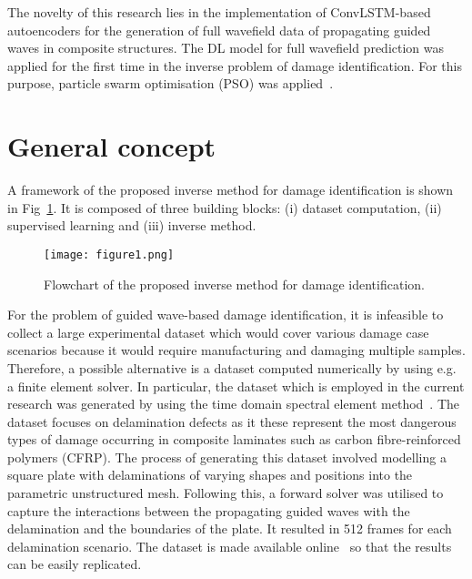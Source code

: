\documentclass[pdflatex,sn-mathphys-num]{sn-jnl}%
\begin{document}
	The novelty of this research lies in the implementation of ConvLSTM-based 
	autoencoders for the generation of full wavefield data of propagating 
	guided waves in composite structures.
	The DL model for full wavefield prediction was applied for the first time 
	in the inverse problem of damage identification.
	For this purpose, particle swarm optimisation (PSO) was 
	applied~\cite{Keneddy1995}.
	\section{General concept}\label{sec2}
	A framework of the proposed inverse method for damage identification is 
	shown in Fig~\ref{fig:complete_flowchart}.
	It is composed of three building blocks: (i) dataset computation, (ii) 
	supervised learning and (iii) inverse method.
	
	\begin{figure} [h!]
		\begin{center}
			\texttt{[image: figure1.png]}
		\end{center}
		\caption{Flowchart of the proposed inverse method for damage 
		identification.} 
		\label{fig:complete_flowchart}
	\end{figure}
	
	For the problem of guided wave-based damage identification, it is 
	infeasible to collect a large experimental dataset which would cover 
	various damage case scenarios because it would require manufacturing and 
	damaging multiple samples.
	Therefore, a possible alternative is a dataset computed numerically by 
	using e.g. a finite element solver.
	In particular, the dataset which is employed in the current research was 
	generated by using the time domain spectral element 
	method~\cite{Kudela2020}.
	The dataset focuses on delamination defects as it these represent the most 
	dangerous types of damage occurring in composite laminates such as carbon 
	fibre-reinforced polymers (CFRP).
	The process of generating this dataset involved modelling a square plate 
	with delaminations of varying shapes and positions into the parametric 
	unstructured mesh. 
	Following this, a forward solver was utilised to capture the interactions 
	between the propagating guided waves with the delamination and the 
	boundaries of the plate.
	It resulted in 512 frames for each delamination scenario.
	The dataset is made available online~\cite{kudela_pawel_2021_5414555} so 
	that the results can be easily replicated.
	
\end{document}
